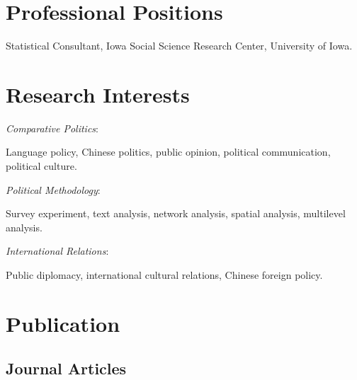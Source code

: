 \documentclass[10.5pt,]{article}
\providecommand{\tightlist}{%
	\setlength{\itemsep}{0pt}\setlength{\parskip}{0pt}}
\renewenvironment{itemize}{
	\begin{list}{}{
			\setlength{\leftmargin}{1.5em}
		}
	}{
	\end{list}
}
\begin{document}
\section{Professional Positions}\label{professional-positions}

\begin{itemize}
\tightlist
\item
  Statistical Consultant, Iowa Social Science Research Center,
  University of Iowa.
\end{itemize}

\section{Research Interests}\label{research-interests}

\begin{itemize}
\tightlist
\item
  \emph{Comparative Politics}:

  \begin{itemize}
  \tightlist
  \item
    Language policy, Chinese politics, public opinion, political
    communication, political culture.
  \end{itemize}
\item
  \emph{Political Methodology}:

  \begin{itemize}
  \tightlist
  \item
    Survey experiment, text analysis, network analysis, spatial
    analysis, multilevel analysis.
  \end{itemize}
\item
  \emph{International Relations}:

  \begin{itemize}
  \tightlist
  \item
    Public diplomacy, international cultural relations, Chinese foreign
    policy.
  \end{itemize}
\end{itemize}

\section{Publication}\label{publication}

\subsection{Journal Articles}\label{journal-articles}
\end{document}
